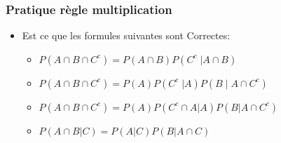 \documentclass{beamer}
\begin{document}
\begin{frame}[<+->]
    \frametitle{Pratique règle multiplication}
   \begin{itemize}
       \small
       \item Est ce que les formules suivantes sont Correctes:\\[4pt]
           \begin{itemize}
               \scriptsize
               \item $P(A\cap B \cap C^c)  = P(A\cap B) P(C^c\;|A\cap B)$\\[12pt]
               \item $P(A\cap B \cap C^c)  = P(A) P(C^c\;|A) P(B\;|\;A\cap
                   C^c)$\\[12pt]
               \item $P(A\cap B\cap C^c) = P(A) P(C^c\cap A|A)P(B|A\cap
                   C^c)$\\[12pt]
               \item $P(A\cap B|C) = P(A|C)P(B|A\cap C)$
           \end{itemize}
   \end{itemize}  
\end{frame}
\end{document}
